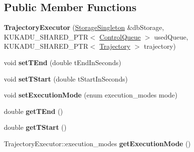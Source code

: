 \subsection*{Public Member Functions}
\begin{DoxyCompactItemize}
\item 
{\bfseries Trajectory\+Executor} (\hyperlink{classkukadu_1_1StorageSingleton}{Storage\+Singleton} \&db\+Storage, K\+U\+K\+A\+D\+U\+\_\+\+S\+H\+A\+R\+E\+D\+\_\+\+P\+TR$<$ \hyperlink{classkukadu_1_1ControlQueue}{Control\+Queue} $>$ used\+Queue, K\+U\+K\+A\+D\+U\+\_\+\+S\+H\+A\+R\+E\+D\+\_\+\+P\+TR$<$ \hyperlink{classkukadu_1_1Trajectory}{Trajectory} $>$ trajectory)\hypertarget{classkukadu_1_1TrajectoryExecutor_a267a4d1e82669681b73d7e88d083bece}{}\label{classkukadu_1_1TrajectoryExecutor_a267a4d1e82669681b73d7e88d083bece}

\item 
void {\bfseries set\+T\+End} (double t\+End\+In\+Seconds)\hypertarget{classkukadu_1_1TrajectoryExecutor_a13be43e9daf3c6ce2b65f1677da1f1ac}{}\label{classkukadu_1_1TrajectoryExecutor_a13be43e9daf3c6ce2b65f1677da1f1ac}

\item 
void {\bfseries set\+T\+Start} (double t\+Start\+In\+Seconds)\hypertarget{classkukadu_1_1TrajectoryExecutor_a5f52adf07c8297df76e5d799608c59eb}{}\label{classkukadu_1_1TrajectoryExecutor_a5f52adf07c8297df76e5d799608c59eb}

\item 
void {\bfseries set\+Execution\+Mode} (enum execution\+\_\+modes mode)\hypertarget{classkukadu_1_1TrajectoryExecutor_aee812f3907721b1227e2576528ec883c}{}\label{classkukadu_1_1TrajectoryExecutor_aee812f3907721b1227e2576528ec883c}

\item 
double {\bfseries get\+T\+End} ()\hypertarget{classkukadu_1_1TrajectoryExecutor_af515075d2bfe6763bfbe2c92ee9feead}{}\label{classkukadu_1_1TrajectoryExecutor_af515075d2bfe6763bfbe2c92ee9feead}

\item 
double {\bfseries get\+T\+Start} ()\hypertarget{classkukadu_1_1TrajectoryExecutor_a6ae8cb9b9fbcf660a18f4904bc99f910}{}\label{classkukadu_1_1TrajectoryExecutor_a6ae8cb9b9fbcf660a18f4904bc99f910}

\item 
Trajectory\+Executor\+::execution\+\_\+modes {\bfseries get\+Execution\+Mode} ()\hypertarget{classkukadu_1_1TrajectoryExecutor_aca52eb9064bc0ec42f579dc7bf296a40}{}\label{classkukadu_1_1TrajectoryExecutor_aca52eb9064bc0ec42f579dc7bf296a40}


\end{DoxyCompactItemize}

